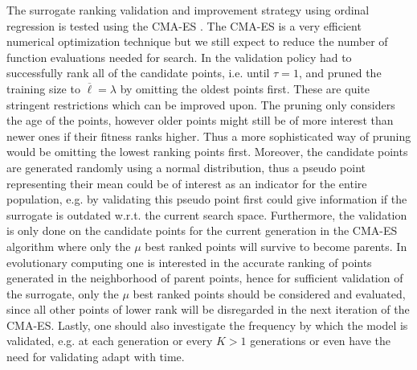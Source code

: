 \documentclass[conference]{IEEEtran}
\begin{document}
The surrogate ranking validation and improvement strategy using ordinal regression is tested using the CMA-ES \cite{hansen:ostermeier:01}. The CMA-ES is a very efficient numerical optimization technique but we still expect to reduce the number of function evaluations needed for search. In \cite{Ru06:PPSN} the validation policy had to successfully rank all of the candidate points, i.e. until $\tau=1$, and pruned the training size to $\overline{\ell} = \lambda$ by omitting the oldest points first. These are quite stringent restrictions which can be improved upon. 
The pruning only considers the age of the points, however older points might still be of more interest than newer ones if their fitness ranks higher. Thus a more sophisticated way of pruning would be omitting the lowest ranking points first. 
Moreover, the candidate points are generated randomly using a normal distribution, thus a pseudo point representing their mean could be of interest as an indicator for the entire population, e.g. by validating this pseudo point first could give information if the surrogate is outdated w.r.t. the current search space. 
Furthermore, the validation is only done on the candidate points for the current generation in the CMA-ES algorithm where only the $\mu$ best ranked points will survive to become parents. In evolutionary computing one is interested in the accurate ranking of points generated in the neighborhood of parent points, hence for sufficient validation of the surrogate, only the $\mu$ best ranked points should be considered and evaluated, since all other points of lower rank will be disregarded in the next iteration of the CMA-ES. 
Lastly, one should also investigate the frequency by which the model is validated, e.g. at each generation or every $K>1$ generations or even have the need for validating adapt with time.
\end{document}
